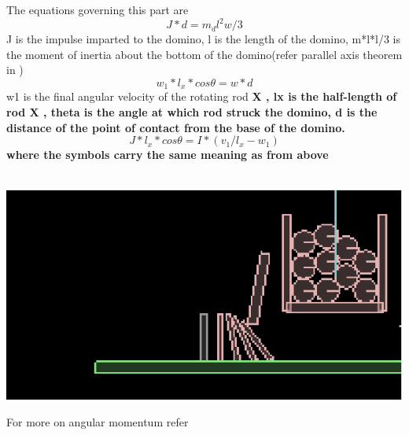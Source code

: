 \documentclass[11pt]{article}
\begin{document}
The equations governing this part are
\begin{equation}J*d=m_dl^2w/3\end{equation}
J is the impulse imparted to the domino, l is the length of the domino, m*l*l/3 is the moment of inertia about the bottom of the domino(refer parallel axis theorem in \cite {dcp})
\begin{equation}w_1*l_x*cos\theta=w*d\end{equation}
w1 is the final angular velocity of the rotating rod \bf X \rm, lx is the half-length of rod \bf X \rm, theta is the angle at which rod struck the domino, d is the distance of the point of contact from the base of the domino.
\begin{equation}J*l_x*cos\theta=I*(v_1/l_x-w_1)\end{equation}
where the symbols carry the same meaning as from above
\\
\\
\centerline{\includegraphics[scale=0.9]{12}}
For more on angular momentum refer \cite{hcv}
\end{document}
